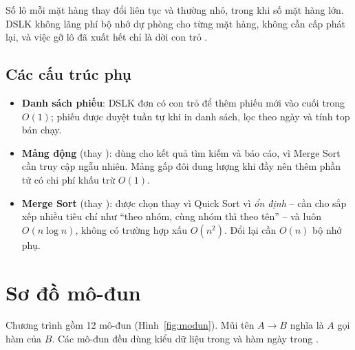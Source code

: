 Số lô mỗi mặt hàng thay đổi liên tục và thường nhỏ, trong khi số mặt hàng lớn. DSLK không lãng phí bộ nhớ dự
phòng cho từng mặt hàng, không cần cấp phát lại, và việc gỡ lô đã xuất hết chỉ là dời con trỏ .

\subsection{Các cấu trúc phụ}

\begin{itemize}
  \item \textbf{Danh sách phiếu}: DSLK đơn có con trỏ  để thêm phiếu mới vào cuối trong $O(1)$;
        phiếu được duyệt tuần tự khi in danh sách, lọc theo ngày và tính top bán chạy.
  \item \textbf{Mảng động } (thay ): dùng cho kết quả tìm kiếm và báo cáo, vì
        Merge Sort cần truy cập ngẫu nhiên. Mảng gấp đôi dung lượng khi đầy nên thêm phần tử có chi phí khấu
        trừ $O(1)$.
  \item \textbf{Merge Sort} (thay ): được chọn thay vì Quick Sort vì \emph{ổn định} -- cần cho
        sắp xếp nhiều tiêu chí như ``theo nhóm, cùng nhóm thì theo tên'' -- và luôn $O(n\log n)$, không có trường hợp
        xấu $O(n^2)$. Đổi lại cần $O(n)$ bộ nhớ phụ.
\end{itemize}

\section{Sơ đồ mô-đun}

Chương trình gồm 12 mô-đun (Hình~\ref{fig:modun}). Mũi tên $A \to B$ nghĩa là $A$ gọi hàm của $B$.
Các mô-đun đều dùng kiểu dữ liệu trong  và hàm ngày trong .

